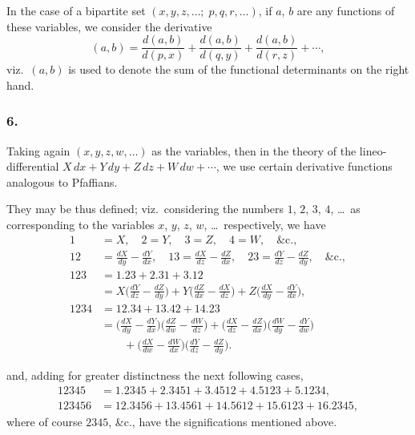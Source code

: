 \documentclass[12pt,a4paper]{article}
\theoremstyle{plain}
\begin{document}
In the case of a bipartite set $(x, y, z, \ldots;\; p, q, r, \ldots)$, if $a$, $b$ are any functions of these variables, we consider the derivative
\[
(a, b) = \frac{d(a, b)}{d(p, x)} + \frac{d(a, b)}{d(q, y)} + \frac{d(a, b)}{d(r, z)} + \cdots,
\]
viz.~$(a, b)$ is used to denote the sum of the functional determinants on the right hand.

\subsubsection*{6.}

Taking again $(x, y, z, w, \ldots)$ as the variables, then in the theory of the lineo-differential $X\,dx + Y\,dy + Z\,dz + W\,dw + \cdots$, we use certain derivative functions analogous to Pfaffians.

They may be thus defined; viz.~considering the numbers $1$, $2$, $3$, $4$, \ldots\ as corresponding to the variables $x$, $y$, $z$, $w$, \ldots\ respectively, we have
\begin{align*}
1 &= X, \quad 2 = Y, \quad 3 = Z, \quad 4 = W, \quad \&\text{c.}, \\
12 &= \frac{dX}{dy} - \frac{dY}{dx}, \quad
13 = \frac{dX}{dz} - \frac{dZ}{dx}, \quad
23 = \frac{dY}{dz} - \frac{dZ}{dy}, \quad \&\text{c.}, \\
123 &= 1.23 + 2.31 + 3.12 \\
&= X\biggl(\frac{dY}{dz} - \frac{dZ}{dy}\biggr) + Y\biggl(\frac{dZ}{dx} - \frac{dX}{dz}\biggr) + Z\biggl(\frac{dX}{dy} - \frac{dY}{dx}\biggr), \\
1234 &= 12.34 + 13.42 + 14.23 \\
&= \biggl(\frac{dX}{dy} - \frac{dY}{dx}\biggr)\biggl(\frac{dZ}{dw} - \frac{dW}{dz}\biggr) + \biggl(\frac{dX}{dz} - \frac{dZ}{dx}\biggr)\biggl(\frac{dW}{dy} - \frac{dY}{dw}\biggr) \\
&\qquad + \biggl(\frac{dX}{dw} - \frac{dW}{dx}\biggr)\biggl(\frac{dY}{dz} - \frac{dZ}{dy}\biggr).
\end{align*}

\newpage
\setcounter{page}{117}

and, adding for greater distinctness the next following cases,
\begin{align*}
12345 &= 1.2345 + 2.3451 + 3.4512 + 4.5123 + 5.1234, \\
123456 &= 12.3456 + 13.4561 + 14.5612 + 15.6123 + 16.2345,
\end{align*}
where of course $2345$, \&c., have the significations mentioned above.
\end{document}
